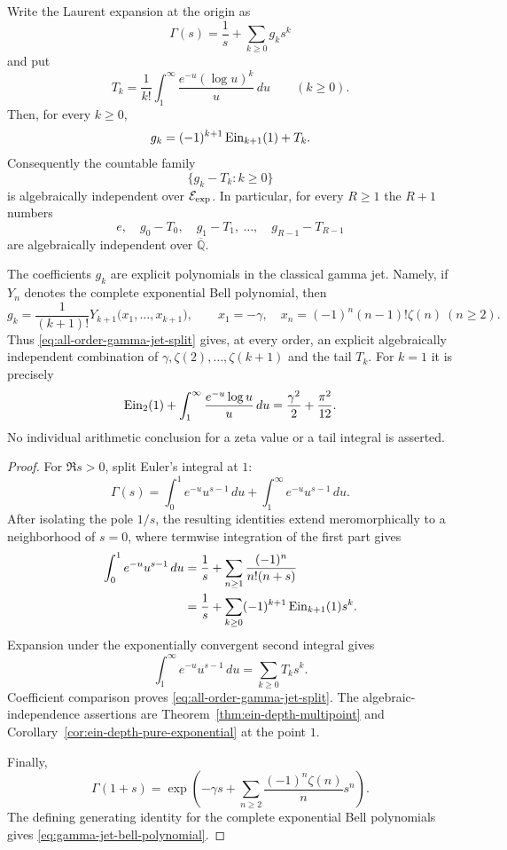 \begin{corollary}
\label{cor:all-order-gamma-jet-split}
Write the Laurent expansion at the origin as
\[
 \Gamma(s)=\frac1s+\sum_{k\geq0}g_ks^k
\]
and put
\[
 T_k=\frac1{k!}\int_1^\infty
       \frac{e^{-u}(\log u)^k}{u}\,du\qquad(k\geq0).
\]
Then, for every $k\geq0$,
\begin{equation}\label{eq:all-order-gamma-jet-split}
 g_k=(-1)^{k+1}\operatorname{Ein}_{k+1}(1)+T_k.
\end{equation}
Consequently the countable family
\[
 \{g_k-T_k:k\geq0\}
\]
is algebraically independent over $\mathcal E_{\mathrm{exp}}$.  In particular, for every
$R\geq1$ the $R+1$ numbers
\[
 e,\quad g_0-T_0,\quad g_1-T_1,\ \ldots,\quad g_{R-1}-T_{R-1}
\]
are algebraically independent over $\overline{\mathbb Q}$.

The coefficients $g_k$ are explicit polynomials in the classical gamma
jet.  Namely, if $Y_n$ denotes the complete exponential Bell polynomial,
then
\begin{equation}\label{eq:gamma-jet-bell-polynomial}
 g_k=\frac1{(k+1)!}
 Y_{k+1}\bigl(x_1,\ldots,x_{k+1}\bigr),
 \qquad
 x_1=-\gamma,\quad
 x_n=(-1)^n(n-1)!\zeta(n)\ (n\geq2).
\end{equation}
Thus \eqref{eq:all-order-gamma-jet-split} gives, at every order, an
explicit algebraically independent combination of
$\gamma,\zeta(2),\ldots,\zeta(k+1)$ and the tail $T_k$.
For $k=1$ it is precisely
\[
 \operatorname{Ein}_{2}(1)+\int_1^\infty\frac{e^{-u}\log u}{u}\,du
 =\frac{\gamma^2}{2}+\frac{\pi^2}{12}.
\]
No individual arithmetic conclusion for a zeta value or a tail integral
is asserted.
\end{corollary}

\begin{proof}
For $\Re s>0$, split Euler's integral at $1$:
\[
 \Gamma(s)=\int_0^1e^{-u}u^{s-1}\,du
           +\int_1^\infty e^{-u}u^{s-1}\,du.
\]
After isolating the pole $1/s$, the resulting identities extend
meromorphically to a neighborhood of $s=0$, where termwise integration of
the first part gives
\begin{align*}
 \int_0^1e^{-u}u^{s-1}\,du
 &=\frac1s+\sum_{n\geq1}\frac{(-1)^n}{n!(n+s)}\\
 &=\frac1s+\sum_{k\geq0}(-1)^{k+1}
   \operatorname{Ein}_{k+1}(1)s^k.
\end{align*}
Expansion under the exponentially convergent second integral gives
\[
 \int_1^\infty e^{-u}u^{s-1}\,du
 =\sum_{k\geq0}T_ks^k.
\]
Coefficient comparison proves \eqref{eq:all-order-gamma-jet-split}.
The algebraic-independence assertions are
Theorem~\ref{thm:ein-depth-multipoint} and
Corollary~\ref{cor:ein-depth-pure-exponential} at the point $1$.

Finally,
\[
 \Gamma(1+s)=
 \exp\!\left(-\gamma s+
   \sum_{n\geq2}\frac{(-1)^n\zeta(n)}n s^n\right).
\]
The defining generating identity for the complete exponential Bell
polynomials gives \eqref{eq:gamma-jet-bell-polynomial}.
\end{proof}
